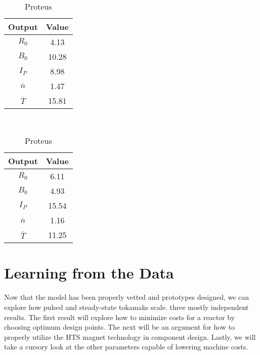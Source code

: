 
\begin{table}[h!]
\centering  
\caption{Proteus and Charybdis Comparison}
\hfill
\begin{subtable}[t]{0.45\textwidth}
\centering  
\caption{Charybdis} ~\\
\begin{tabular}{ c|c } 

Output           & Value       \\
\hline
$R_{0}$          & 4.13            \\
$B_{0}$          & 10.28            \\
$I_{P}$          & 8.98            \\
$\overline n$    & 1.47            \\
$\overline T$    & 15.81           \\
\end{tabular}
\end{subtable}
\hfill
\begin{subtable}[t]{0.45\textwidth}
\centering  
\caption{Proteus} ~\\
\begin{tabular}{ c|c } 

Output           & Value       \\
\hline
$R_{0}$          & 6.11             \\
$B_{0}$          & 4.93            \\
$I_{P}$          & 15.54            \\
$\overline n$    & 1.16            \\
$\overline T$    & 11.25            \\
\end{tabular}
\end{subtable}
\hfill
\hfill
\label{table:proteus_charybdis}
\end{table}

\section{Learning from the Data}

Now that the model has been properly vetted and prototypes designed, we can explore how pulsed and steady-state tokamaks scale.  three mostly independent results. The first result will explore how to minimize costs for a reactor by choosing optimum design points. The next will be an argument for how to properly utilize the HTS magnet technology in component design. Lastly, we will take a cursory look at the other parameters capable of lowering machine costs.

